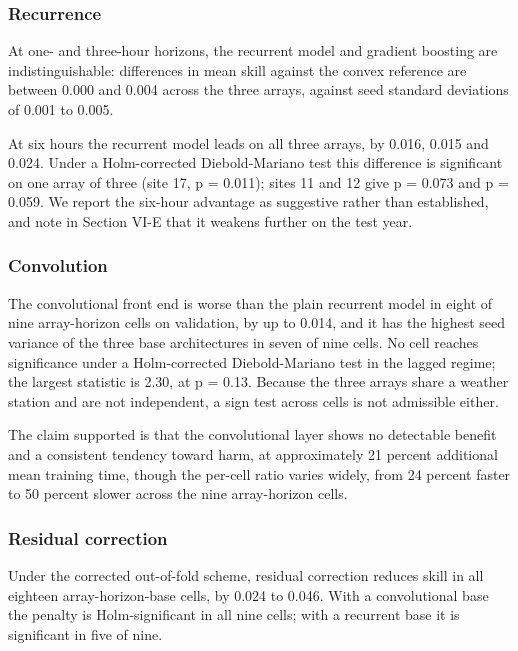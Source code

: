 

\subsubsection{Recurrence}

At one- and three-hour horizons, the recurrent model and gradient
boosting are indistinguishable: differences in mean skill against the
convex reference are between 0.000 and 0.004 across the three arrays,
against seed standard deviations of 0.001 to 0.005.

At six hours the recurrent model leads on all three arrays, by 0.016,
0.015 and 0.024. Under a Holm-corrected Diebold-Mariano test this
difference is significant on one array of three (site 17, p = 0.011);
sites 11 and 12 give p = 0.073 and p = 0.059. We report the six-hour
advantage as suggestive rather than established, and note in Section
VI-E that it weakens further on the test year.

\subsubsection{Convolution}

The convolutional front end is worse than the plain recurrent model in
eight of nine array-horizon cells on validation, by up to 0.014, and it
has the highest seed variance of the three base architectures in seven
of nine cells. No cell reaches significance under a Holm-corrected
Diebold-Mariano test in the lagged regime; the largest statistic is
2.30, at p = 0.13. Because the three arrays share a weather station and
are not independent, a sign test across cells is not admissible either.

The claim supported is that the convolutional layer shows no detectable
benefit and a consistent tendency toward harm, at approximately 21
percent additional mean training time, though the per-cell ratio varies
widely, from 24 percent faster to 50 percent slower across the nine
array-horizon cells.

\subsubsection{Residual correction}

Under the corrected out-of-fold scheme, residual correction reduces
skill in all eighteen array-horizon-base cells, by 0.024 to 0.046. With
a convolutional base the penalty is Holm-significant in all nine cells;
with a recurrent base it is significant in five of nine.

